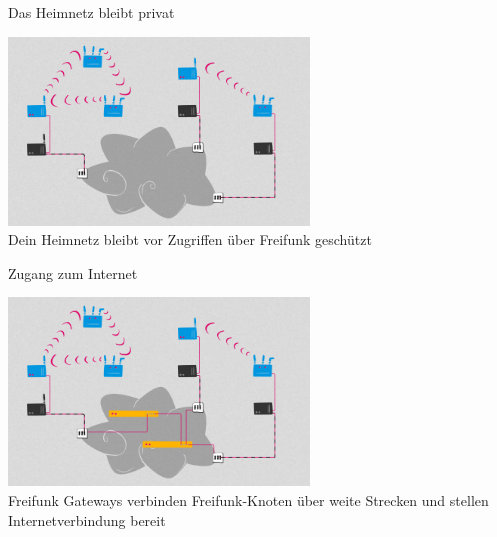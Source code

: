 \documentclass[10pt]{beamer}
\begin{document}
  \begin{frame}{Das Heimnetz bleibt privat}
    \begin{center}
      \includegraphics[height=5cm]{images/network_4}\\
      \vspace{1em}
      Dein Heimnetz bleibt vor Zugriffen über Freifunk geschützt
      \vspace{1em}
    \end{center}
  \end{frame}

  \begin{frame}{Zugang zum Internet}
    \begin{center}
      \includegraphics[height=5cm]{images/network_5}\\
      \vspace{1em}
      Freifunk Gateways verbinden Freifunk-Knoten über weite Strecken und stellen Internetverbindung bereit
    \end{center}
  \end{frame}
\end{document}
